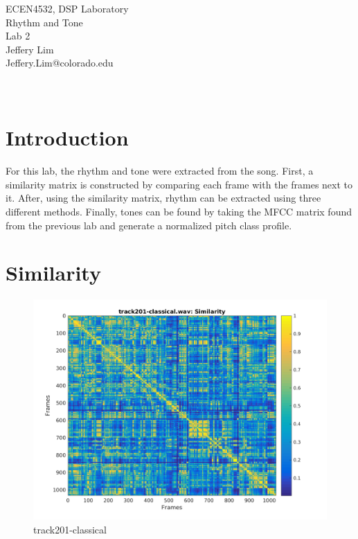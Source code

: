 \documentclass[11pt, a4paper]{article}
\begin{document}
\begin{center}
  \Huge ECEN4532, DSP Laboratory \\
  \huge Rhythm and Tone \\
  \huge Lab 2\\
  
  \vspace{7in}
    \huge Jeffery Lim \\
    \huge Jeffery.Lim@colorado.edu\\~\\~\\
\end{center}
\pagebreak


\tableofcontents

\pagebreak

\section{Introduction}

For this lab, the rhythm and tone were extracted from the song. First, a similarity matrix is constructed by comparing each frame with the frames next to it. After, using the similarity matrix, rhythm can be extracted using three different methods. Finally, tones can be found by taking the MFCC matrix found from the previous lab and generate a normalized pitch class profile. 

\section{Similarity}



\begin{figure}[H]
    \centering
    \includegraphics[width=.8\textwidth]{track201-classical-similarity.png}
    \caption{track201-classical}
\end{figure}
\end{document}
